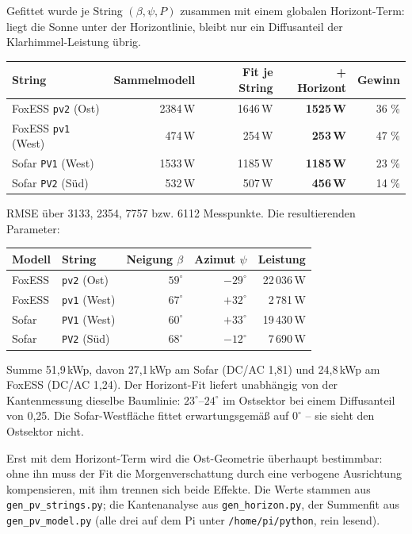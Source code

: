 \documentclass[11pt, a4paper]{article}
\begin{document}
Gefittet wurde je String $(\beta, \psi, P)$ zusammen mit einem globalen
Horizont-Term: liegt die Sonne unter der Horizontlinie, bleibt nur ein
Diffusanteil der Klarhimmel-Leistung übrig.

\begin{center}
\begin{tabular}{lrrrr}
\toprule
String & Sammelmodell & Fit je String & + Horizont & Gewinn\\
\midrule
FoxESS \texttt{pv2} (Ost)  & 2384\,W & 1646\,W & \textbf{1525\,W} & 36 \%\\
FoxESS \texttt{pv1} (West) &  474\,W &  254\,W & \textbf{253\,W}  & 47 \%\\
Sofar \texttt{PV1} (West)  & 1533\,W & 1185\,W & \textbf{1185\,W} & 23 \%\\
Sofar \texttt{PV2} (Süd)   &  532\,W &  507\,W & \textbf{456\,W}  & 14 \%\\
\bottomrule
\end{tabular}
\end{center}

RMSE über 3133, 2354, 7757 bzw. 6112 Messpunkte. Die resultierenden Parameter:

\begin{center}
\begin{tabular}{llrrr}
\toprule
Modell & String & Neigung $\beta$ & Azimut $\psi$ & Leistung\\
\midrule
FoxESS & \texttt{pv2} (Ost)  & $59^\circ$ & $-29^\circ$ & 22\,036\,W\\
FoxESS & \texttt{pv1} (West) & $67^\circ$ & $+32^\circ$ &  2\,781\,W\\
Sofar  & \texttt{PV1} (West) & $60^\circ$ & $+33^\circ$ & 19\,430\,W\\
Sofar  & \texttt{PV2} (Süd)  & $68^\circ$ & $-12^\circ$ &  7\,690\,W\\
\bottomrule
\end{tabular}
\end{center}

Summe 51{,}9\,kWp, davon 27{,}1\,kWp am Sofar (DC/AC 1{,}81) und 24{,}8\,kWp am
FoxESS (DC/AC 1{,}24). Der Horizont-Fit liefert unabhängig von der
Kantenmessung dieselbe Baumlinie: $23^\circ$--$24^\circ$ im Ostsektor bei einem
Diffusanteil von 0{,}25. Die Sofar-Westfläche fittet erwartungsgemäß auf
$0^\circ$ -- sie sieht den Ostsektor nicht.

Erst mit dem Horizont-Term wird die Ost-Geometrie überhaupt bestimmbar: ohne ihn
muss der Fit die Morgenverschattung durch eine verbogene Ausrichtung
kompensieren, mit ihm trennen sich beide Effekte. Die Werte stammen aus
\texttt{gen\_pv\_strings.py}; die Kantenanalyse aus \texttt{gen\_horizon.py}, der
Summenfit aus \texttt{gen\_pv\_model.py} (alle drei auf dem Pi unter
\texttt{/home/pi/python}, rein lesend).
\end{document}

